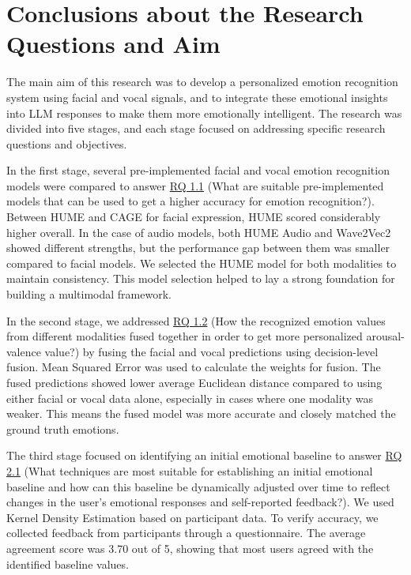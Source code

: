 \section{Conclusions about the Research Questions and Aim}
\label{sec:conclusion-rq}

\par The main aim of this research was to develop a personalized emotion recognition system using facial and vocal signals, and to integrate these emotional insights into LLM responses to make them more emotionally intelligent. The research was divided into five stages, and each stage focused on addressing specific research questions and objectives.

\par In the first stage, several pre-implemented facial and vocal emotion recognition models were compared to answer \hyperref[rq:1.1]{RQ 1.1} (What are suitable pre-implemented models that can be used to get a higher accuracy for emotion recognition?). Between HUME and CAGE for facial expression, HUME scored considerably higher overall. In the case of audio models, both HUME Audio and Wave2Vec2 showed different strengths, but the performance gap between them was smaller compared to facial models. We selected the HUME model for both modalities to maintain consistency. This model selection helped to lay a strong foundation for building a multimodal framework.

\par In the second stage, we addressed \hyperref[rq:1.2]{RQ 1.2} (How the recognized emotion values from different modalities fused together in order to get more personalized arousal-valence value?) by fusing the facial and vocal predictions using decision-level fusion. Mean Squared Error was used to calculate the weights for fusion. The fused predictions showed lower average Euclidean distance compared to using either facial or vocal data alone, especially in cases where one modality was weaker. This means the fused model was more accurate and closely matched the ground truth emotions.

\par The third stage focused on identifying an initial emotional baseline to answer \hyperref[rq:2.1]{RQ 2.1} (What techniques are most suitable for establishing an initial emotional baseline and how can this baseline be dynamically adjusted over time to reflect changes in the user's emotional responses and self-reported feedback?). We used Kernel Density Estimation based on participant data. To verify accuracy, we collected feedback from participants through a questionnaire. The average agreement score was 3.70 out of 5, showing that most users agreed with the identified baseline values.
 
